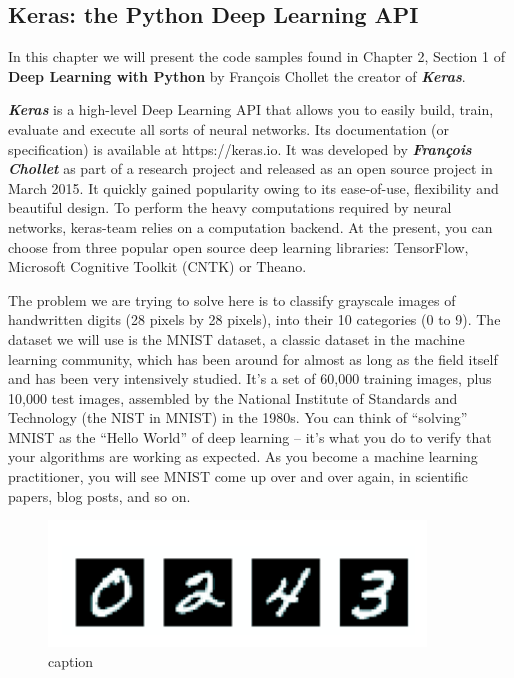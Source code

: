 \documentclass[11pt]{article}
\begin{document}
    \hypertarget{keras-the-python-deep-learning-api}{%
\subsection{Keras: the Python Deep Learning
API}\label{keras-the-python-deep-learning-api}}

    In this chapter we will present the code samples found in Chapter 2,
Section 1 of \textbf{Deep Learning with Python} by François Chollet the
creator of \textbf{\emph{Keras}}.

\textbf{\emph{Keras}} is a high-level Deep Learning API that allows you
to easily build, train, evaluate and execute all sorts of neural
networks. Its documentation (or specification) is available at
https://keras.io. It was developed by \textbf{\emph{François Chollet}}
as part of a research project and released as an open source project in
March 2015. It quickly gained popularity owing to its ease-of-use,
flexibility and beautiful design. To perform the heavy computations
required by neural networks, keras-team relies on a computation backend.
At the present, you can choose from three popular open source deep
learning libraries: TensorFlow, Microsoft Cognitive Toolkit (CNTK) or
Theano.

The problem we are trying to solve here is to classify grayscale images
of handwritten digits (28 pixels by 28 pixels), into their 10 categories
(0 to 9). The dataset we will use is the MNIST dataset, a classic
dataset in the machine learning community, which has been around for
almost as long as the field itself and has been very intensively
studied. It's a set of 60,000 training images, plus 10,000 test images,
assembled by the National Institute of Standards and Technology (the
NIST in MNIST) in the 1980s. You can think of ``solving'' MNIST as the
``Hello World'' of deep learning -- it's what you do to verify that your
algorithms are working as expected. As you become a machine learning
practitioner, you will see MNIST come up over and over again, in
scientific papers, blog posts, and so on.

    \begin{figure}
\centering
\includegraphics{./pic/chapter-5-1_pic_5.png}
\caption{caption}
\end{figure}
\end{document}
